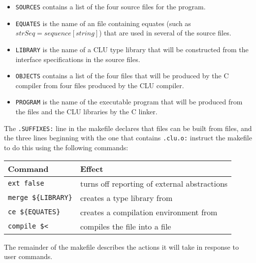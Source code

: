 \begin{itemize}
\item
{\tt SOURCES} contains a list of the four source  files for the
program.
\item
{\tt EQUATES} is the name of an  file containing equates (such as
$strSeq = sequence[string]$) that are used in several of the source files.
\item
{\tt LIBRARY} is the name of a CLU type library that will be constructed from
the interface specifications in the source files.
\item
{\tt OBJECTS} contains a list of the four  files that will be
produced by the C compiler from four  files produced by the CLU compiler.
\item
{\tt PROGRAM} is the name of the executable program that will be produced from
the  files and the CLU libraries by the C linker.
\end{itemize}

The {\tt .SUFFIXES:} line in the makefile declares that  files can be
built from  files, and the three lines beginning with the one that
contains {\tt .clu.o:} instruct the makefile to do this using the following
commands:

\begin{center}
\begin{tabular}{l|l}
Command	& Effect\\
\hline
{\tt ext false}			& turns off reporting of external abstractions\\
{\tt merge \$\{LIBRARY\}}	& creates a type library from \fname{countWords.lib}\\
{\tt ce \$\{EQUATES\}}	& creates a compilation environment from \fname{Equates.equ}\\
{\tt compile \$<}		& compiles the \fname{.clu} file into a \fname{.o} file
\end{tabular}
\end{center}	

\noindent

The remainder of the makefile describes the actions it will take in response to
user commands.

